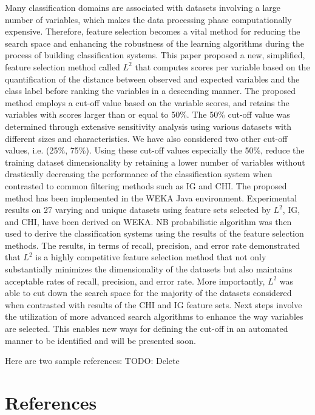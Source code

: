 \documentclass[review]{elsarticle}
\begin{document}
Many classification domains are associated with datasets involving a large number of variables, which makes the data processing phase computationally expensive. Therefore, feature selection becomes a vital method for reducing the search space and enhancing the robustness of the learning algorithms during the process of building classification systems. This paper proposed a new, simplified, feature selection method called $ L^2 $ that computes scores per variable based on the quantification of the distance between observed and expected variables and the class label before ranking the variables in a descending manner. The proposed method employs a cut-off value based on the variable scores, and retains the variables with scores larger than or equal to 50\%. The 50\% cut-off value was determined through extensive sensitivity analysis using various datasets with different sizes and characteristics. We have also considered two other cut-off values, i.e. (25\%, 75\%). Using these cut-off values especially the 50\%, reduce the training dataset dimensionality by retaining a lower number of variables without drastically decreasing the performance of the classification system when contrasted to common filtering methods such as IG and CHI.  The proposed method has been implemented in the WEKA Java environment. Experimental results on 27 varying and unique datasets using feature sets selected by $ L^2 $, IG, and CHI, have been derived on WEKA. NB probabilistic algorithm was then used to derive the classification systems using the results of the feature selection methods. The results, in terms of recall, precision, and error rate demonstrated that $ L^2 $ is a highly competitive feature selection method that not only substantially minimizes the dimensionality of the datasets but also maintains acceptable rates of recall, precision, and error rate. More importantly, $ L^2 $ was able to cut down the search space for the majority of the datasets considered when contrasted with results of the CHI and IG feature sets.  Next steps involve the utilization of more advanced search algorithms to enhance the way variables are selected.  This enables new ways for defining the cut-off in an automated manner to be identified and will be presented soon.  


Here are two sample references: TODO: Delete



\section*{References}


\end{document}
